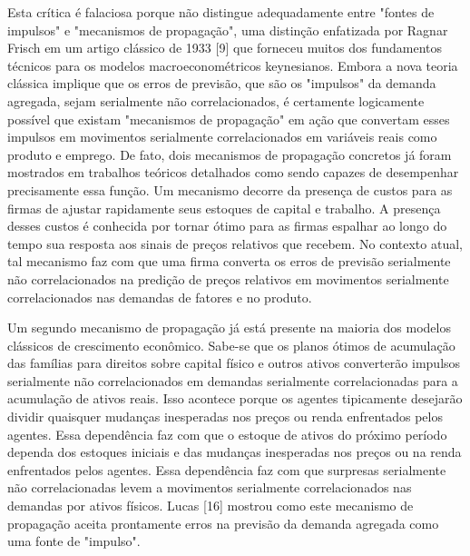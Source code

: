 \documentclass[12pt]{article}
\begin{document}
Esta crítica é falaciosa porque não distingue adequadamente entre "fontes de impulsos" e "mecanismos de propagação", uma distinção enfatizada por Ragnar Frisch em um artigo clássico de 1933 [9] que forneceu muitos dos fundamentos técnicos para os modelos macroeconométricos keynesianos. Embora a nova teoria clássica implique que os erros de previsão, que são os "impulsos" da demanda agregada, sejam serialmente não correlacionados, é certamente logicamente possível que existam "mecanismos de propagação" em ação que convertam esses impulsos em movimentos serialmente correlacionados em variáveis reais como produto e emprego. De fato, dois mecanismos de propagação concretos já foram mostrados em trabalhos teóricos detalhados como sendo capazes de desempenhar precisamente essa função. Um mecanismo decorre da presença de custos para as firmas de ajustar rapidamente seus estoques de capital e trabalho. A presença desses custos é conhecida por tornar ótimo para as firmas espalhar ao longo do tempo sua resposta aos sinais de preços relativos que recebem. No contexto atual, tal mecanismo faz com que uma firma converta os erros de previsão serialmente não correlacionados na predição de preços relativos em movimentos serialmente correlacionados nas demandas de fatores e no produto.

Um segundo mecanismo de propagação já está presente na maioria dos modelos clássicos de crescimento econômico. Sabe-se que os planos ótimos de acumulação das famílias para direitos sobre capital físico e outros ativos converterão impulsos serialmente não correlacionados em demandas serialmente correlacionadas para a acumulação de ativos reais. Isso acontece porque os agentes tipicamente desejarão dividir quaisquer mudanças inesperadas nos preços ou renda enfrentados pelos agentes. Essa dependência faz com que o estoque de ativos do próximo período dependa dos estoques iniciais e das mudanças inesperadas nos preços ou na renda enfrentados pelos agentes. Essa dependência faz com que surpresas serialmente não correlacionadas levem a movimentos serialmente correlacionados nas demandas por ativos físicos. Lucas [16] mostrou como este mecanismo de propagação aceita prontamente erros na previsão da demanda agregada como uma fonte de "impulso".
\end{document}
